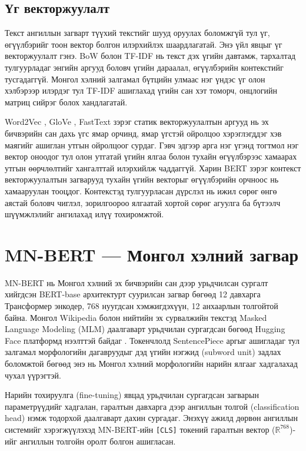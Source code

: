 \subsection{Үг векторжуулалт}
\label{sec:word-embedding}

Текст ангиллын загварт түүхий текстийг шууд оруулах боломжгүй тул үг,
өгүүлбэрийг тоон вектор болгон илэрхийлэх шаардлагатай. Энэ үйл явцыг үг
векторжуулалт гэнэ. BoW болон TF-IDF нь текст дэх үгийн давтамж, тархалтад
тулгуурладаг энгийн аргууд боловч үгийн дараалал, өгүүлбэрийн контекстийг
тусгадаггүй. Монгол хэлний залгамал бүтцийн улмаас нэг үндэс үг олон хэлбэрээр
илэрдэг тул TF-IDF ашиглахад үгийн сан хэт томорч, онцлогийн матриц сийрэг
болох хандлагатай.

Word2Vec \cite{mikolov2013}, GloVe \cite{pennington2014}, FastText
\cite{bojanowski2017} зэрэг статик векторжуулалтын аргууд нь эх бичвэрийн сан дахь үгс
ямар орчинд, ямар үгстэй ойролцоо хэрэглэгддэг хэв маягийг ашиглан утгын
ойролцоог сурдаг. Гэвч эдгээр арга нэг үгэнд тогтмол нэг вектор оноодог тул олон утгатай
үгийн ялгаа болон тухайн өгүүлбэрээс хамаарах утгын өөрчлөлтийг хангалттай
илэрхийлж чаддаггүй. Харин BERT зэрэг контекст векторжуулалтын загварууд тухайн
үгийн векторыг өгүүлбэрийн орчноос нь хамааруулан тооцдог. Контекстэд
тулгуурласан дүрслэл нь ижил сөрөг өнгө аястай боловч чиглэл, зорилгоороо
ялгаатай хортой сөрөг агуулга ба бүтээлч шүүмжлэлийг ангилахад илүү
тохиромжтой.
\section{MN-BERT --- Монгол хэлний загвар}

MN-BERT нь Монгол хэлний эх бичвэрийн сан дээр урьдчилсан сургалт хийгдсэн BERT-base
архитектурт суурилсан загвар бөгөөд 12 давхарга Трансформер энкодер, 768
нуугдсан хэмжигдэхүүн, 12 анхаарлын толгойтой байна. Монгол Wikipedia болон
нийтийн эх сурвалжийн текстэд Masked Language Modeling (MLM) даалгаварт
урьдчилан сургагдсан бөгөөд
Hugging Face платформд нээлттэй байдаг \cite{mongolianBert2019}. Токенчлолд
SentencePiece аргыг ашигладаг
тул залгамал морфологийн дагавруудыг дэд үгийн нэгжид (subword unit) задлах
боломжтой бөгөөд энэ нь Монгол хэлний морфологийн нарийн ялгааг хадгалахад
чухал үүрэгтэй.

Нарийн тохируулга (fine-tuning) явцад урьдчилан сургагдсан загварын
параметрүүдийг хадгалан, гаралтын давхарга дээр ангиллын толгой (classification
head) нэмж тодорхой даалгаварт дахин сургадаг. Энэхүү ажилд дөрвөн ангиллын
системийг хэрэгжүүлэхэд MN-BERT-ийн \texttt{[CLS]} токений гаралтын вектор
($\mathbb{R}^{768}$)-ийг ангиллын толгойн оролт болгон ашигласан.

